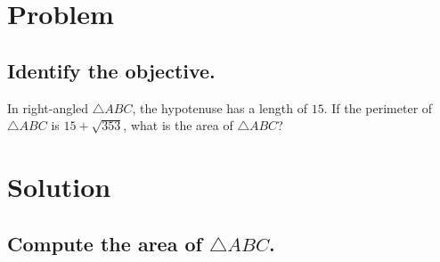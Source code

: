 \documentclass{beamer} %
\begin{document}
\begin{frame} %
  \titlepage
\end{frame}

\section{Problem}

\subsection*{Identify the objective.}

\begin{frame}
  In right-angled $\triangle ABC$, the hypotenuse has a length of $15$. If the perimeter of $\triangle ABC$ is $15 + \sqrt{353}$, what is the area of $\triangle ABC$?
\end{frame}

\section{Solution}

\subsection*{Compute the area of $\triangle ABC$.}

\begin{comment}
\begin{frame}
  \begin{center}
    \begin{tikzpicture}[scale=0.5]
      \draw (0,4.46971821313) node [above left] {$A$};
      \draw (0,0) node [below left] {$B$};
      \draw (14.3185760149,0) node [right] {$C$};
      \draw (0,0) -- (0,4.46971821313);
      \draw (0,0) -- (14.3185760149,0);
      \draw (0,4.46971821313) -- (14.3185760149,0) node [midway,above] {$15$};
      \coordinate (A) at (0,4.46971821313);
      \coordinate (B) at (0,0);
      \coordinate (C) at (14.3185760149,0);
      \tkzMarkRightAngle(A,B,C)
    \end{tikzpicture}
  \end{center}
  \[
    AB + BC = \sqrt{353}
  \]
  \[
    AB^2 + BC^2 = AC^2 = 15^2 = 225
  \]
  \[
    (AB+BC)^2 = AB^2 + BC^2 + 2\cdot AB\cdot BC = 225 + 2\cdot AB\cdot BC = 353
  \]
  \[
    \implies 2\cdot AB\cdot BC = 128 \implies AB\cdot BC = 64
  \]
  \[
    \text{Area of }\triangle ABC = \frac{1}{2}\cdot AB \cdot BC = \frac{1}{2} \cdot 64 = \boxed{32}
  \]
\end{frame}
\end{comment}
\end{document}
